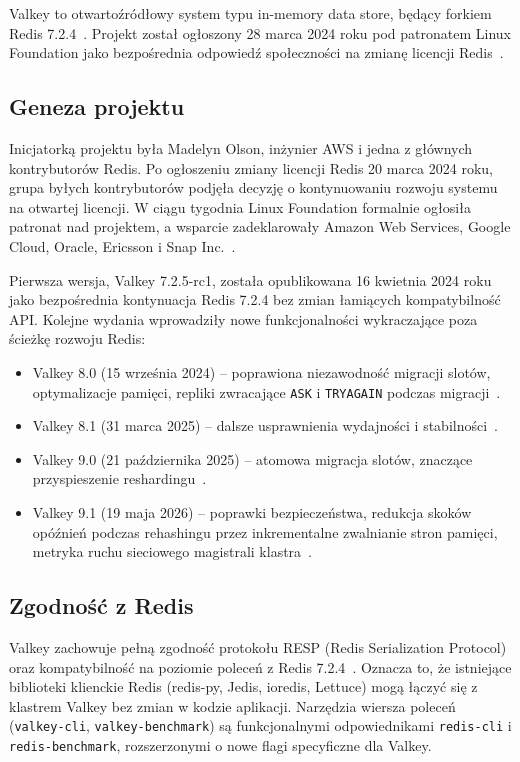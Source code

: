Valkey to otwartoźródłowy system typu in-memory data store, będący forkiem Redis 7.2.4~\cite{valkeyDocumentation}. Projekt został ogłoszony 28 marca 2024 roku pod patronatem Linux Foundation jako bezpośrednia odpowiedź społeczności na zmianę licencji Redis~\cite{linuxFoundationValkey}.

\subsection{Geneza projektu}

Inicjatorką projektu była Madelyn Olson, inżynier AWS i jedna z głównych kontrybutorów Redis. Po ogłoszeniu zmiany licencji Redis 20 marca 2024 roku, grupa byłych kontrybutorów podjęła decyzję o kontynuowaniu rozwoju systemu na otwartej licencji. W ciągu tygodnia Linux Foundation formalnie ogłosiła patronat nad projektem, a wsparcie zadeklarowały Amazon Web Services, Google Cloud, Oracle, Ericsson i Snap Inc.~\cite{linuxFoundationValkey}.

Pierwsza wersja, Valkey 7.2.5-rc1, została opublikowana 16 kwietnia 2024 roku jako bezpośrednia kontynuacja Redis 7.2.4 bez zmian łamiących kompatybilność API. Kolejne wydania wprowadziły nowe funkcjonalności wykraczające poza ścieżkę rozwoju Redis:

\begin{itemize}
    \item Valkey 8.0 (15 września 2024) -- poprawiona niezawodność migracji slotów, optymalizacje pamięci, repliki zwracające \texttt{ASK} i \texttt{TRYAGAIN} podczas migracji~\cite{valkey80release}.
    \item Valkey 8.1 (31 marca 2025) -- dalsze usprawnienia wydajności i stabilności~\cite{valkey81release}.
    \item Valkey 9.0 (21 października 2025) -- atomowa migracja slotów, znaczące przyspieszenie reshardingu~\cite{valkey90release, valkeyAtomicSlotMigration}.
    \item Valkey 9.1 (19 maja 2026) -- poprawki bezpieczeństwa, redukcja skoków opóźnień podczas rehashingu przez inkrementalne zwalnianie stron pamięci, metryka ruchu sieciowego magistrali klastra~\cite{valkey91release}.
\end{itemize}

\subsection{Zgodność z Redis}

Valkey zachowuje pełną zgodność protokołu RESP (Redis Serialization Protocol) oraz kompatybilność na poziomie poleceń z Redis 7.2.4~\cite{valkeyDocumentation}. Oznacza to, że istniejące biblioteki klienckie Redis (redis-py, Jedis, ioredis, Lettuce) mogą łączyć się z klastrem Valkey bez zmian w kodzie aplikacji. Narzędzia wiersza poleceń (\texttt{valkey-cli}, \texttt{valkey-benchmark}) są funkcjonalnymi odpowiednikami \texttt{redis-cli} i \texttt{redis-benchmark}, rozszerzonymi o nowe flagi specyficzne dla Valkey.

